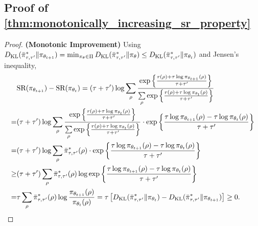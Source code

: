 \subsection{Proof of \cref{thm:monotonically_increasing_sr_property}}
\begin{proof}
	{\bf (Monotonic Improvement)} Using $D_{\mathrm{KL}}(\bar{\pi}_{\tau,\tau^{\prime}}^* \| \pi_{\theta_{t+1}}) = \min_{\pi_\theta \in \Pi}{ D_{\mathrm{KL}}(\bar{\pi}_{\tau,\tau^{\prime}}^* \| \pi_\theta)} \le D_{\mathrm{KL}}(\bar{\pi}_{\tau,\tau^{\prime}}^* \| \pi_{\theta_t})$ and Jensen's inequality,
	\begin{equation*}
	\begin{split}
	&\text{SR}(\pi_{\theta_{t+1}}) - \text{SR}(\pi_{\theta_t}) = (\tau + \tau^{\prime}) \log{ \sum\limits_{\rho}{ \frac{  \exp\left\{ \frac{r(\rho) + \tau \log{\pi_{\theta_{t+1}}(\rho)} }{\tau + \tau^{\prime}} \right\}  }{ \sum\limits_{\rho}{  \exp\left\{ \frac{r(\rho) + \tau \log{\pi_{\theta_t}(\rho)} }{\tau + \tau^{\prime}} \right\} } }  } } \\
	=& (\tau + \tau^{\prime}) \log{ \sum\limits_{\rho}{ \frac{  \exp\left\{ \frac{r(\rho) + \tau \log{\pi_{\theta_t}(\rho)} }{\tau + \tau^{\prime}} \right\}  }{ \sum\limits_{\rho}{  \exp\left\{ \frac{r(\rho) + \tau \log{\pi_{\theta_t}(\rho)} }{\tau + \tau^{\prime}} \right\} } }  } \cdot \exp\left\{ \frac{\tau \log{\pi_{\theta_{t+1}}(\rho)} - \tau \log{\pi_{\theta_t}(\rho)} }{\tau + \tau^{\prime}} \right\} } \\
	=& (\tau + \tau^{\prime}) \log{ \sum\limits_{\rho}{ \bar{\pi}_{\tau,\tau^{\prime}}^*(\rho) } \cdot \exp\left\{ \frac{\tau \log{\pi_{\theta_{t+1}}(\rho)} - \tau \log{\pi_{\theta_t}(\rho)} }{\tau + \tau^{\prime}} \right\} } \\
	\ge& (\tau + \tau^{\prime}) \sum\limits_{\rho}{ \bar{\pi}_{\tau,\tau^{\prime}}^*(\rho) \log{ \exp\left\{ \frac{\tau \log{\pi_{\theta_{t+1}}(\rho)} - \tau \log{\pi_{\theta_t}(\rho)} }{\tau + \tau^{\prime}} \right\} } } \\
	=& \tau \sum\limits_{\rho}{ \bar{\pi}_{\tau,\tau^{\prime}}^*(\rho) \log{ \frac{\pi_{\theta_{t+1}}(\rho)}{\pi_{\theta_t}(\rho)} } } = \tau \left[ D_{\mathrm{KL}}(\bar{\pi}_{\tau,\tau^{\prime}}^* \| \pi_{\theta_t}) - D_{\mathrm{KL}}(\bar{\pi}_{\tau,\tau^{\prime}}^* \| \pi_{\theta_{t+1}})\right] \ge 0.
	\end{split}
	\end{equation*}
	

\end{proof}
